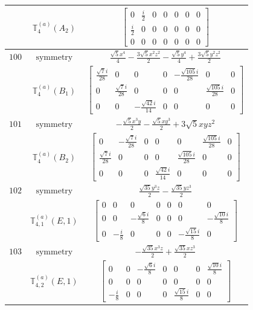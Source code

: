 \documentclass[fleqn,8pt,landscape]{jsarticle}
\begin{document}
\begin{longtable}{ccc}
$  $ & $ \mathbb{T}_{4}^{(a)}(A_{2}) $ & $ \begin{bmatrix} 0 & \frac{i}{2} & 0 & 0 & 0 & 0 & 0 \\ \frac{i}{2} & 0 & 0 & 0 & 0 & 0 & 0 \\ 0 & 0 & 0 & 0 & 0 & 0 & 0 \end{bmatrix} $ \\ \hline
$ 100 $ & $ \text{symmetry} $ & $ \frac{\sqrt{5} x^{4}}{4} - \frac{3 \sqrt{5} x^{2} z^{2}}{2} - \frac{\sqrt{5} y^{4}}{4} + \frac{3 \sqrt{5} y^{2} z^{2}}{2} $ \\
$  $ & $ \mathbb{T}_{4}^{(a)}(B_{1}) $ & $ \begin{bmatrix} \frac{\sqrt{7} i}{28} & 0 & 0 & 0 & - \frac{\sqrt{105} i}{28} & 0 & 0 \\ 0 & \frac{\sqrt{7} i}{28} & 0 & 0 & 0 & \frac{\sqrt{105} i}{28} & 0 \\ 0 & 0 & - \frac{\sqrt{42} i}{14} & 0 & 0 & 0 & 0 \end{bmatrix} $ \\ \hline
$ 101 $ & $ \text{symmetry} $ & $ - \frac{\sqrt{5} x^{3} y}{2} - \frac{\sqrt{5} x y^{3}}{2} + 3 \sqrt{5} x y z^{2} $ \\
$  $ & $ \mathbb{T}_{4}^{(a)}(B_{2}) $ & $ \begin{bmatrix} 0 & - \frac{\sqrt{7} i}{28} & 0 & 0 & 0 & \frac{\sqrt{105} i}{28} & 0 \\ \frac{\sqrt{7} i}{28} & 0 & 0 & 0 & \frac{\sqrt{105} i}{28} & 0 & 0 \\ 0 & 0 & 0 & \frac{\sqrt{42} i}{14} & 0 & 0 & 0 \end{bmatrix} $ \\ \hline
$ 102 $ & $ \text{symmetry} $ & $ \frac{\sqrt{35} y^{3} z}{2} - \frac{\sqrt{35} y z^{3}}{2} $ \\
$  $ & $ \mathbb{T}_{4,1}^{(a)}(E,1) $ & $ \begin{bmatrix} 0 & 0 & 0 & 0 & 0 & 0 & 0 \\ 0 & 0 & - \frac{\sqrt{6} i}{8} & 0 & 0 & 0 & - \frac{\sqrt{10} i}{8} \\ 0 & - \frac{i}{8} & 0 & 0 & 0 & - \frac{\sqrt{15} i}{8} & 0 \end{bmatrix} $ \\ \hline
$ 103 $ & $ \text{symmetry} $ & $ - \frac{\sqrt{35} x^{3} z}{2} + \frac{\sqrt{35} x z^{3}}{2} $ \\
$  $ & $ \mathbb{T}_{4,2}^{(a)}(E,1) $ & $ \begin{bmatrix} 0 & 0 & - \frac{\sqrt{6} i}{8} & 0 & 0 & 0 & \frac{\sqrt{10} i}{8} \\ 0 & 0 & 0 & 0 & 0 & 0 & 0 \\ - \frac{i}{8} & 0 & 0 & 0 & \frac{\sqrt{15} i}{8} & 0 & 0 \end{bmatrix} $ \\ \hline

\end{longtable}
\end{document}
